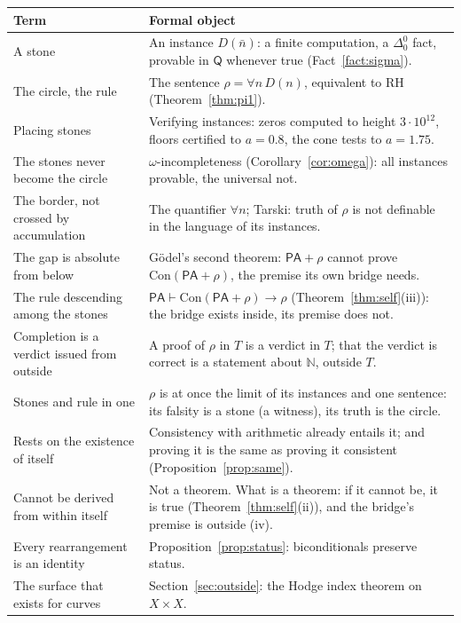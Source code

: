 \documentclass[11pt]{article}
\theoremstyle{definition}
\theoremstyle{remark}
\newcommand{\N}{\mathbb N}
\newcommand{\PA}{\mathsf{PA}}
\newcommand{\RA}{\mathsf{Q}}
\newcommand{\Con}{\mathrm{Con}}
\newcommand{\RH}{\mathrm{RH}}
\begin{document}
\begin{center}
\renewcommand{\arraystretch}{1.25}
\begin{tabular}{>{\raggedright\arraybackslash}p{} >{\raggedright\arraybackslash}p{}}
\toprule
\textbf{Term} & \textbf{Formal object} \\
\midrule
A stone & An instance $D(\bar n)$: a finite computation, a $\Delta^0_0$ fact, provable in $\RA$ whenever true (Fact~\ref{fact:sigma}). \\
The circle, the rule & The sentence $\rho=\forall n\,D(n)$, equivalent to $\RH$ (Theorem~\ref{thm:pi1}). \\
Placing stones & Verifying instances: zeros computed to height $3\cdot10^{12}$, floors certified to $a=0.8$, the cone tests to $a=1.75$. \\
The stones never become the circle & $\omega$-incompleteness (Corollary~\ref{cor:omega}): all instances provable, the universal not. \\
The border, not crossed by accumulation & The quantifier $\forall n$; Tarski: truth of $\rho$ is not definable in the language of its instances. \\
The gap is absolute from below & G\"odel's second theorem: $\PA+\rho$ cannot prove $\Con(\PA+\rho)$, the premise its own bridge needs. \\
The rule descending among the stones & $\PA\vdash\Con(\PA+\rho)\to\rho$ (Theorem~\ref{thm:self}(iii)): the bridge exists inside, its premise does not. \\
Completion is a verdict issued from outside & A proof of $\rho$ in $T$ is a verdict in $T$; that the verdict is correct is a statement about $\N$, outside $T$. \\
Stones and rule in one & $\rho$ is at once the limit of its instances and one sentence: its falsity is a stone (a witness), its truth is the circle. \\
Rests on the existence of itself & Consistency with arithmetic already entails it; and proving it is the same as proving it consistent (Proposition~\ref{prop:same}). \\
Cannot be derived from within itself & Not a theorem. What is a theorem: if it cannot be, it is true (Theorem~\ref{thm:self}(ii)), and the bridge's premise is outside (iv). \\
Every rearrangement is an identity & Proposition~\ref{prop:status}: biconditionals preserve status. \\
The surface that exists for curves & Section~\ref{sec:outside}: the Hodge index theorem on $X\times X$. \\
\bottomrule
\end{tabular}
\end{center}
\end{document}
